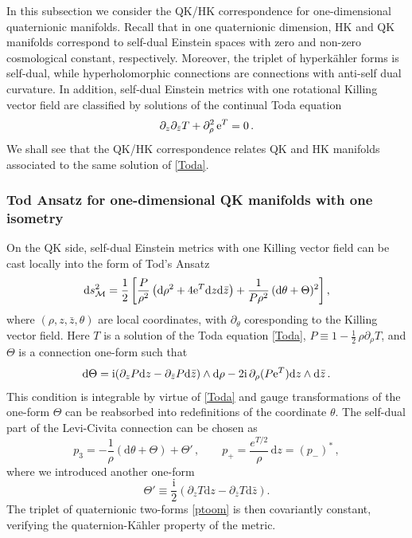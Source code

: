 \documentclass[12pt,reqno]{article}
\numberwithin{equation}{section}
\newcommand{\be}{\begin{equation}}
\newcommand{\ee}{\end{equation}}
\def\({\left(}
\def\){\right)}
\def\p{\partial}
\def\haf{\textstyle\frac{1}{2}}
\newcommand{\de}{\mathrm{d}}
\newcommand{\I}{\mathrm{i}}
\newcommand{\cM}{\mathcal{M}}
\def\pa{\partial}
\newcommand{\hk}{{hyperk\"ahler}\xspace}
\newcommand{\qk}{{quaternion-K\"ahler}\xspace}
\def\sigp{{\theta}}
\def\pTheta{\Theta'}
\numberwithin{equation}{section}
\begin{document}
In this subsection we consider the QK/HK correspondence for one-dimensional
quaternionic manifolds. Recall that in one quaternionic dimension, HK and QK
manifolds correspond to self-dual Einstein spaces with zero and
non-zero cosmological constant, respectively. Moreover, the triplet of
\hk forms is self-dual, while hyperholomorphic
connections are connections with  anti-self dual curvature. In addition,
self-dual Einstein metrics with one rotational Killing vector field
are classified by solutions of the continual Toda equation
\be
\p_{z} \p_{\bar z}  T+\p_ \rho^2 \, {\rm e}^T = 0\, .
\label{Toda}
\ee
We shall see that the QK/HK correspondence relates QK and HK
manifolds associated to the same solution of \eqref{Toda}.



\subsubsection{Tod Ansatz for one-dimensional QK manifolds with one isometry}
\label{sec_TodaQK}

On the QK side, self-dual Einstein metrics with one Killing vector field can be
cast locally into the form of Tod's Ansatz \cite{MR1423177}
\be
\label{dstodaqk}
\de s_\cM^2 =\frac12\left[
\frac{P}{\rho^2} \left( \de \rho^2 + 4 {\rm e}^T \de z \de\bar z \right)
+ \frac{1}{P\rho^2}\,(\de \sigp+ \Theta )^2\right] ,
\ee
where $(\rho,z,\bar z, \sigp)$ are local coordinates, with $\pa_\sigp$ coresponding
to the Killing vector field.  Here $T$ is a solution of the Toda equation \eqref{Toda},
$P\equiv 1- \haf\,\rho \pa_ \rho T $, and $\Theta$ is a connection one-form such that
\be
\label{dth}
\de \Theta = \I (\pa_z P \de z - \pa_{\bar z} P \de \bar z)\wedge \de  \rho
- 2\I\, \partial_\rho(P {\rm e}^T)\de z\wedge \de\bar z\, .
\ee
This condition is integrable by virtue of \eqref{Toda} and gauge transformations of the one-form
$\Theta$ can be reabsorbed into redefinitions of the coordinate $\sigp$.
The self-dual part of the Levi-Civita connection can be chosen as
\be
\label{qkconn}
p_3 = - \frac{1}{\rho} \( \de \sigp + \Theta\) + \pTheta \, ,
\qquad
p_+ = \frac{e^{T/2}}{\rho}\, \de z = (p_-)^*\, ,
\ee
where we introduced another one-form
\be
\label{defThetap}
\pTheta\equiv \frac{\I}{2} \left( \pa_z T \de z - \pa_{\bar z} T \de \bar z \right).
\ee
The triplet of quaternionic two-forms \eqref{ptoom}
is then covariantly constant, verifying the \qk property of the metric.
\end{document}

